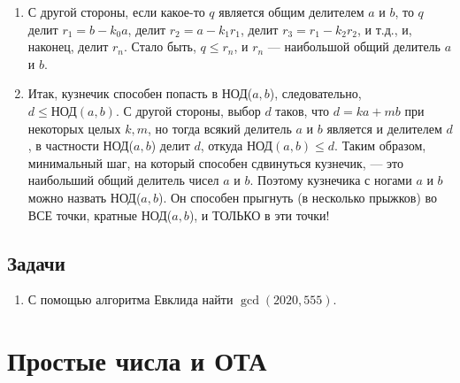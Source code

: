 \begin{enumerate}
\item С другой стороны, если какое-то $q$ является общим делителем $a$ и $b$, то $q$ делит $r_1=b-k_0a$, делит $r_2=a-k_1r_1$, делит $r_3=r_1-k_2r_2$, и т.д., и, наконец, делит $r_n$. Стало быть, $q\le r_n$, и $r_n$ --- наибольшой общий делитель $a$ и $b$.
\item Итак, кузнечик способен попасть в НОД($a,b$), следовательно, $d\le\mbox{НОД}(a,b)$. С другой стороны, выбор $d$ таков, что $d=ka+mb$ при некоторых целых $k,m$, но тогда всякий делитель $a$ и $b$ является и делителем $d$, в частности НОД($a,b$) делит $d$, откуда $\mbox{НОД}(a,b)\le d$. Таким образом, минимальный шаг, на который способен сдвинуться кузнечик, --- это наибольший общий делитель чисел $a$ и $b$. Поэтому кузнечика с ногами $a$ и $b$ можно назвать НОД($a,b$). Он способен прыгнуть (в несколько прыжков) во ВСЕ точки, кратные НОД($a,b$), и ТОЛЬКО в эти точки!
\end{enumerate}
\subsection{Задачи}
\begin{enumerate}
\item С помощью алгоритма Евклида найти $\gcd(2020,555)$.
\end{enumerate}


\section{Простые числа и ОТА}

